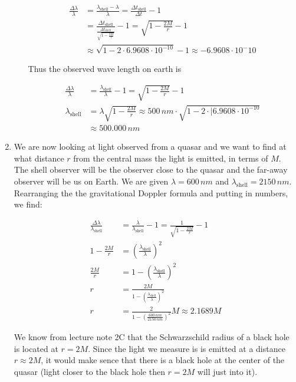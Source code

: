 \documentclass[a4paper,10pt,english]{article}
\begin{document}
\begin{enumerate}
\begin{enumerate}
\begin{align*}
\frac{\Delta \lambda}{\lambda}&=\frac{\lambda_{\text{shell}}-\lambda}{\lambda}=\frac{\Delta t_{\text{shell}}}{\Delta t}-1\\
&=\frac{\Delta t_{\text{shell}}}{\frac{\Delta t_{\text{shell}}}{\sqrt{1-\frac{2M}{r}}}}-1=\sqrt{1-\frac{2M}{r}}-1\\
&\approx\sqrt{1-2\cdot6.9608\cdot10^{-10}}-1\approx-6.9608\cdot10^-{10}
\end{align*}

Thus the observed wave length on earth is

\begin{align*}
\frac{\Delta \lambda}{\lambda}&=\frac{\lambda_{\text{shell}}}{\lambda}-1=\sqrt{1-\frac{2M}{r}}-1\\
\lambda_{\text{shell}}&=\lambda\sqrt{1-\frac{2M}{r}}\approx500\,nm\cdot\sqrt{1-2\cdot|6.9608\cdot10^{-10}}\\
&\approx500.000\,nm
\end{align*}
  
\end{enumerate}

\item We are now looking at light observed from a quasar and we want to find at what distance $r$ from the central mass the light is emitted, in terms of $M$. The shell observer will be the observer close to the quasar and the far-away observer will be us on Earth. We are given $\lambda=600\,nm$ and $\lambda_{\text{shell}}=2150\,nm$. Rearranging the the gravitational Doppler formula and putting in numbers, we find:

\begin{align*}
\frac{\Delta \lambda}{\lambda_{\text{shell}}}&=\frac{\lambda}{\lambda_{\text{shell}}}-1=\frac{1}{\sqrt{1-\frac{2M}{r}}}-1\\
1-\frac{2M}{r}&=\left(\frac{\lambda_{\text{shell}}}{\lambda}\right)^{2}\\
\frac{2M}{r}&=1-\left(\frac{\lambda_{\text{shell}}}{\lambda}\right)^{2}\\
r&=\frac{2M}{1-\left(\frac{\lambda_{\text{shell}}}{\lambda}\right)^{2}}\\
r&=\frac{2}{1-\left(\frac{600\,nm}{2150\,nm}\right)^{2}}M\approx2.1689M
\end{align*}

We know from lecture note 2C that the Schwarzschild radius of a black hole is located at $r=2M$. Since the light we measure is is emitted at a distance $r\approx2M$, it would make sence that there is a black hole at the center of the quasar (light closer to the black hole then $r=2M$ will just  into it).


\end{enumerate}
\end{document}
